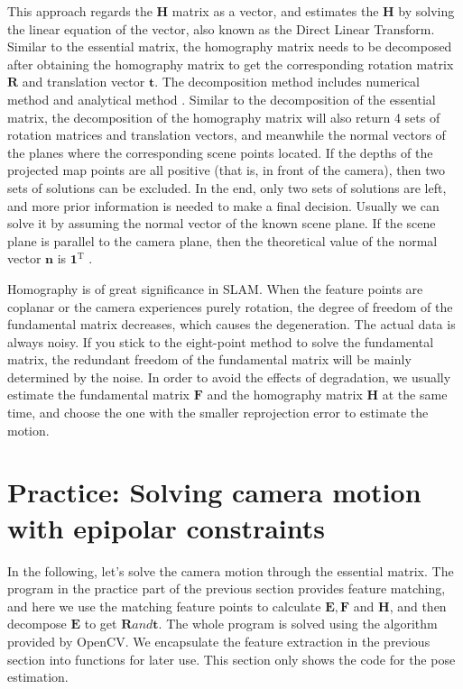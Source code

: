 This approach regards the $\bm{H}$ matrix as a vector, and estimates the $\bm{H}$ by solving the linear equation of the vector, also known as the Direct Linear Transform. Similar to the essential matrix, the homography matrix needs to be decomposed after obtaining the homography matrix to get the corresponding rotation matrix $\bm{R}$ and translation vector $\bm{t}$. The decomposition method includes numerical method \textsuperscript{\cite{faugeras1988motion, Zhang1996}} and analytical method \textsuperscript{\cite{malis2007deeper}}. Similar to the decomposition of the essential matrix, the decomposition of the homography matrix will also return 4 sets of rotation matrices and translation vectors, and meanwhile the normal vectors of the planes where the corresponding scene points located. If the depths of the projected map points are all positive (that is, in front of the camera), then two sets of solutions can be excluded. In the end, only two sets of solutions are left, and more prior information is needed to make a final decision. Usually we can solve it by assuming the normal vector of the known scene plane. If the scene plane is parallel to the camera plane, then the theoretical value of the normal vector $\bm{n}$ is $\bm{1}^\mathrm{T}$ .

Homography is of great significance in SLAM. When the feature points are coplanar or the camera experiences purely rotation, the degree of freedom of the fundamental matrix decreases, which causes the degeneration. The actual data is always noisy. If you stick to the eight-point method to solve the fundamental matrix, the redundant freedom of the fundamental matrix will be mainly determined by the noise. In order to avoid the effects of degradation, we usually estimate the fundamental matrix $\bm{F}$ and the homography matrix $\bm{H}$ at the same time, and choose the one with the smaller reprojection error to estimate the motion.

\section{Practice: Solving camera motion with epipolar constraints}
In the following, let's solve the camera motion through the essential matrix. The program in the practice part of the previous section provides feature matching, and here we use the matching feature points to calculate $\bm{E}, \bm{F}$ and $\bm{H}$, and then decompose $ \bm{E}$ to get $\bm{R} and \bm{t}$. The whole program is solved using the algorithm provided by OpenCV. We encapsulate the feature extraction in the previous section into functions for later use. This section only shows the code for the pose estimation.


